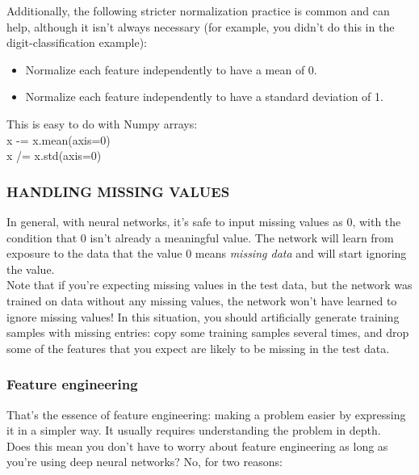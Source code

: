 \documentclass{article}
\numberwithin{equation}{section} %
\begin{document}
Additionally, the following stricter normalization practice is common and can help,
although it isn’t always necessary (for example, you didn’t do this in the digit-classification example):

\begin{itemize}
	\item Normalize each feature independently to have a mean of 0.
	\item Normalize each feature independently to have a standard deviation of 1.
\end{itemize}

This is easy to do with Numpy arrays: \\

x -= x.mean(axis=0) \\
x /= x.std(axis=0) \\

\subsubsection*{HANDLING MISSING VALUES}

In general, with neural networks, it’s safe to input missing values as 0, with the condition that 0 isn’t already a meaningful value. The network will learn from exposure to the data that the value 0 means \textit{missing data} and will start ignoring the value. \\

Note that if you’re expecting missing values in the test data, but the network was
trained on data without any missing values, the network won’t have learned to ignore
missing values! In this situation, you should artificially generate training samples with missing entries: copy some training samples several times, and drop some of the features that you expect are likely to be missing in the test data. \\

\subsubsection{Feature engineering}

That’s the essence of feature engineering: making a problem easier by expressing
it in a simpler way. It usually requires understanding the problem in depth. \\

Does this mean you don’t have to worry about feature engineering as
long as you’re using deep neural networks? No, for two reasons:
\end{document}
